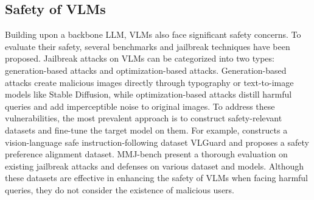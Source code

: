 \vspace{-0.5em}
\subsection{Safety of VLMs}
\vspace{-0.5em}
Building upon a backbone LLM, VLMs also face significant safety concerns. To evaluate their safety, several benchmarks \citep{rtvlm, jailbreakv, vlsbench} and jailbreak techniques \citep{figstep, mm-safetybench, visual_adv, imgjp} have been proposed. Jailbreak attacks on VLMs can be categorized into two types: generation-based attacks and optimization-based attacks. Generation-based attacks \citep{figstep, mm-safetybench} create malicious images directly through typography or text-to-image models like Stable Diffusion, while optimization-based attacks \citep{visual_adv, imgjp} distill harmful queries and add imperceptible noise to original images. To address these vulnerabilities, the most prevalent approach is to construct safety-relevant datasets and fine-tune the target model on them. For example, \citet{vlguard} constructs a vision-language safe instruction-following dataset VLGuard and \citet{spa-vl} proposes a safety preference alignment dataset. MMJ-bench \cite{mmj-bench} present a thorough evaluation on existing jailbreak attacks and defenses on various dataset and models. Although these datasets are effective in enhancing the safety of VLMs when facing harmful queries, they do not consider the existence of malicious users.

